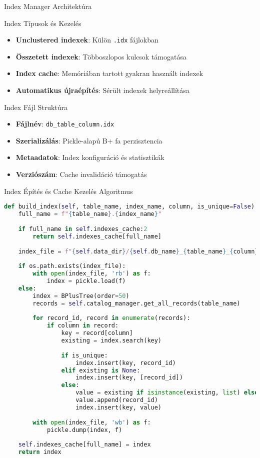 \documentclass[aspectratio=169]{beamer}
\begin{document}
\begin{frame}{Index Manager Architektúra}
\begin{block}{Index Típusok és Kezelés}
\begin{itemize}
    \item \textbf{Unclustered indexek}: Külön \texttt{.idx} fájlokban
    \item \textbf{Összetett indexek}: Többoszlopos kulcsok támogatása
    \item \textbf{Index cache}: Memóriában tartott gyakran használt indexek
    \item \textbf{Automatikus újraépítés}: Sérült indexek helyreállítása
\end{itemize}
\end{block}

\begin{block}{Index Fájl Struktúra}
\begin{itemize}
    \item \textbf{Fájlnév}: \texttt{db\_table\_column.idx}
    \item \textbf{Szerializálás}: Pickle-alapú B+ fa perzisztencia
    \item \textbf{Metaadatok}: Index konfiguráció és statisztikák
    \item \textbf{Verziószám}: Cache invalidáció támogatás
\end{itemize}
\end{block}
\end{frame}

\begin{frame}[fragile]{Index Építés és Cache Kezelés Algoritmus}
\begin{lstlisting}[language=Python]
def build_index(self, table_name, index_name, column, is_unique=False):
    full_name = f"{table_name}.{index_name}"
    
    if full_name in self.indexes_cache:2
        return self.indexes_cache[full_name]
    
    index_file = f"{self.data_dir}/{self.db_name}_{table_name}_{column}.idx"
    
    if os.path.exists(index_file):
        with open(index_file, 'rb') as f:
            index = pickle.load(f)
    else:
        index = BPlusTree(order=50)
        records = self.catalog_manager.get_all_records(table_name)
        
        for record_id, record in enumerate(records):
            if column in record:
                key = record[column]
                existing = index.search(key)
                
                if is_unique:
                    index.insert(key, record_id)
                elif existing is None:
                    index.insert(key, [record_id])
                else:
                    value = existing if isinstance(existing, list) else [existing]
                    value.append(record_id)
                    index.insert(key, value)
        
        with open(index_file, 'wb') as f:
            pickle.dump(index, f)
    
    self.indexes_cache[full_name] = index
    return index
\end{lstlisting}
\end{frame}
\end{document}
